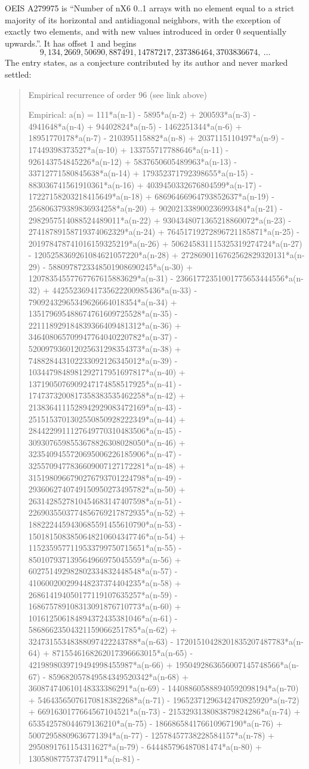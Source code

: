 \documentclass[11pt,a4paper]{article}
\theoremstyle{plain}
\theoremstyle{definition}
\begin{document}
OEIS A279975 is ``Number of nX6 0..1 arrays with no element equal to a strict majority of its horizontal and antidiagonal neighbors, with the exception of exactly two elements, and with new values introduced in order 0 sequentially upwards.''. It has offset $1$ and begins
\[
9, 134, 2669, 50690, 887491, 14787217, 237386464, 3703836674,\ \dots
\]
The entry states, as a conjecture contributed by its author and never marked settled:
\begin{quote}
Empirical recurrence of order 96 (see link above)

Empirical: a(n) = 111*a(n-1) - 5895*a(n-2) + 200593*a(n-3) - 4941648*a(n-4) + 94402824*a(n-5) - 1462251344*a(n-6) + 18951770178*a(n-7) - 210395115882*a(n-8) + 2037115110497*a(n-9) - 17449398373527*a(n-10) + 133755717788646*a(n-11) - 926143754845226*a(n-12) + 5837650605489963*a(n-13) - 33712771580845638*a(n-14) + 179352371792398655*a(n-15) - 883036741561910361*a(n-16) + 4039450332676804599*a(n-17) - 17227158203218415649*a(n-18) + 68696466964793852637*a(n-19) - 256806379389836934258*a(n-20) + 902021338900236993484*a(n-21) - 2982957514088524489011*a(n-22) + 9304348071365218860072*a(n-23) - 27418789158719374062329*a(n-24) + 76451719272896721185871*a(n-25) - 201978478741016159325219*a(n-26) + 506245831115325319274724*a(n-27) - 1205258369261084621057220*a(n-28) + 2728690116762562829320131*a(n-29) - 5880978723348501908690245*a(n-30) + 12078354557767767615883629*a(n-31) - 23661772351001775653444556*a(n-32) + 44255236941735622200985436*a(n-33) - 79092432965349626664018354*a(n-34) + 135179695488674761609725528*a(n-35) - 221118929184839366409481312*a(n-36) + 346408065709947764040220782*a(n-37) - 520097936012025631298354373*a(n-38) + 748828443102233092126345012*a(n-39) - 1034479848981292717951697817*a(n-40) + 1371905076909247174858517925*a(n-41) - 1747373200817358383535462258*a(n-42) + 2138364111528942929083472169*a(n-43) - 2515153701302550850928222349*a(n-44) + 2844229911127649770310483506*a(n-45) - 3093076598553678826308028050*a(n-46) + 3235409455720695006226185906*a(n-47) - 3255709477836609007127172281*a(n-48) + 3151980966790276793701224798*a(n-49) - 2936062740749150950273495782*a(n-50) + 2631428527810454683147407598*a(n-51) - 2269035503774856769217872935*a(n-52) + 1882224459430685591455610790*a(n-53) - 1501815083850648210604347746*a(n-54) + 1152359577119533799750715651*a(n-55) - 850107937139564966975045559*a(n-56) + 602751492982802334832448548*a(n-57) - 410600200299448237374404235*a(n-58) + 268614194050177119107635257*a(n-59) - 168675789108313091876710773*a(n-60) + 101612506184894372435381046*a(n-61) - 58686623504321159066251785*a(n-62) + 32473155348388097422243788*a(n-63) - 17201510428201835207487783*a(n-64) + 8715546168262017396663015*a(n-65) - 4219898039719494998455987*a(n-66) + 1950492863656007145748566*a(n-67) - 859682057849584349520342*a(n-68) + 360874740610148333386291*a(n-69) - 144088605888940592098194*a(n-70) + 54643565076170818382268*a(n-71) - 19652371296342470825920*a(n-72) + 6691630177664567104521*a(n-73) - 2153293138083879824286*a(n-74) + 653542578044679136210*a(n-75) - 186686584176610967190*a(n-76) + 50072958809636771394*a(n-77) - 12578457738228584157*a(n-78) + 2950891761154311627*a(n-79) - 644485796487081474*a(n-80) + 130580877573747911*a(n-81) - 
\end{quote}
\end{document}
